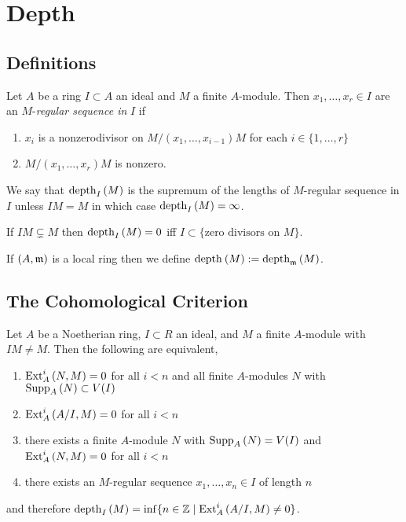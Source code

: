 \documentclass[12pt]{article}
\begin{document}
\section{Depth}

\subsection{Definitions}

\begin{defn}
Let $A$ be a ring $I \subset A$ an ideal and $M$ a finite $A$-module. Then $x_1, \dots, x_r \in I$ are an $M$-\textit{regular sequence in} $I$ if
\begin{enumerate}
\item $x_i$ is a nonzerodivisor on $M / (x_1, \dots, x_{i-1}) M$ for each $i \in \{1, \dots, r \}$
\item $M / (x_1, \dots, x_r)M$ is nonzero. 
\end{enumerate}
We say that $\mathrm{depth}_{I} \left( M \right)$ is the supremum of the lengths of $M$-regular sequence in $I$ unless $IM = M$ in which case $\mathrm{depth}_{I} \left( M \right) = \infty$.
\end{defn}

\begin{rmk}
If $IM \subsetneq M$ then $\mathrm{depth}_{I} \left( M \right) = 0$ iff $I \subset \{ \text{zero divisors on } M \}$.
\end{rmk}

\begin{rmk}
If $(A, \mathfrak{m})$ is a local ring then we define $\mathrm{depth}_{} \left( M \right) := \mathrm{depth}_{\mathfrak{m}} \left( M \right)$.
\end{rmk}

\subsection{The Cohomological Criterion}

\begin{lemma}
Let $A$ be a Noetherian ring, $I \subset R$ an ideal, and $M$ a finite $A$-module with $IM \neq M$. Then the following are equivalent,
\begin{enumerate}
\item $\mathrm{Ext}^{i}_{A} \left( N, M \right) = 0$ for all $i < n$ and all finite $A$-modules $N$ with $\mathrm{Supp}_{A}\left(N \right) \subset V(I)$

\item $\mathrm{Ext}^{i}_{A} \left( A/I, M \right) = 0$ for all $i < n$

\item there exists a finite $A$-module $N$ with $\mathrm{Supp}_{A}\left(N \right) = V(I)$ and $\mathrm{Ext}^{i}_{A} \left( N, M \right) = 0$ for all $i < n$

\item there exists an $M$-regular sequence $x_1, \dots, x_n \in I$ of length $n$
\end{enumerate}
and therefore $\mathrm{depth}_{I} \left( M \right) = \inf \{ n \in \mathbb{Z} \mid \mathrm{Ext}^{i}_{A} \left( A/I, M \right) \neq 0 \}$.
\end{lemma}
\end{document}
